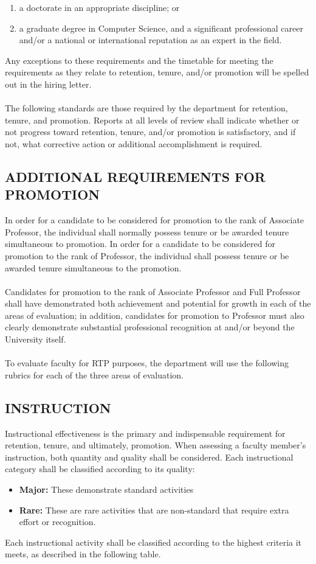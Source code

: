 \documentclass{article}
\begin{document}
\begin{enumerate}
\item a doctorate in an appropriate discipline; or
\item a graduate degree in Computer Science, and a significant professional career and/or a national or international reputation as an expert in the field.
\end{enumerate}

Any exceptions to these requirements and the timetable for meeting the requirements as they relate to retention, tenure, and/or promotion will be spelled out in the hiring letter.
\\\\
The following standards are those required by the department for retention, tenure, and promotion. Reports at all levels of review shall indicate whether or not progress toward retention, tenure, and/or promotion is satisfactory, and if not, what corrective action or additional accomplishment is required.


\subsection{ADDITIONAL REQUIREMENTS FOR PROMOTION}

In order for a candidate to be considered for promotion to the rank of Associate Professor, the individual shall normally possess tenure or be awarded tenure simultaneous to promotion. In order for a candidate to be considered for promotion to the rank of Professor, the individual shall possess tenure or be awarded tenure simultaneous to the promotion.
\\\\
Candidates for promotion to the rank of Associate Professor and Full Professor shall have demonstrated both achievement and potential for growth in each of the areas of evaluation; in addition, candidates for promotion to Professor must also clearly demonstrate substantial professional recognition at and/or beyond the University itself.
\\\\
To evaluate faculty for RTP purposes, the department will use the following rubrics for each of the three areas of evaluation.

\subsection{INSTRUCTION}
Instructional effectiveness is the primary and indispensable requirement for retention, tenure, and ultimately, promotion. When assessing a faculty member’s instruction, both quantity and quality shall be considered. Each instructional category shall be classified according to its quality:
\begin{itemize}
\item \textbf{Major:} These demonstrate standard activities
\item \textbf{Rare:} These are rare activities that are non-standard that require extra effort or recognition.
\end{itemize}
Each instructional activity shall be classified according to the highest criteria it meets, as described in the following table.
\end{document}
